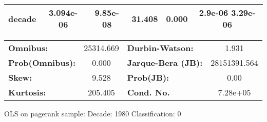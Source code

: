 \begin{center}
\begin{tabular}{lccccc}
\textbf{decade}             &    3.094e-06  &     9.85e-08     &    31.408  &         0.000        &       2.9e-06  3.29e-06       \\
\bottomrule
\end{tabular}
\begin{tabular}{lclc}
\textbf{Omnibus:}       & 25314.669 & \textbf{  Durbin-Watson:     } &      1.931    \\
\textbf{Prob(Omnibus):} &    0.000  & \textbf{  Jarque-Bera (JB):  } & 28151391.564  \\
\textbf{Skew:}          &    9.528  & \textbf{  Prob(JB):          } &       0.00    \\
\textbf{Kurtosis:}      &  205.405  & \textbf{  Cond. No.          } &   7.28e+05    \\
\bottomrule
\end{tabular}
\end{center}
\break
OLS on pagerank sample: Decade: 1980 Classification: 0
